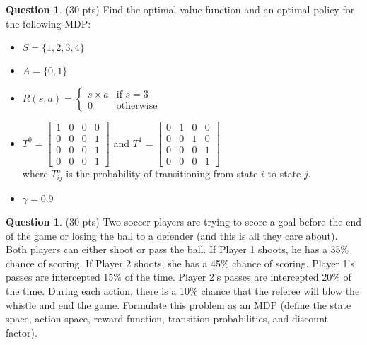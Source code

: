 \documentclass{article}
\theoremstyle{definition}
\newtheorem{question}[thm]{Question}
\begin{document}
\begin{question} (30 pts)
    Find the optimal value function and an optimal policy for the following MDP:
    \begin{itemize}
        \item $S = \{1,2,3,4\}$
        \item $A = \{0,1\}$
        \item $R(s, a) = \begin{cases}
                s \times a &\text{if } s = 3\\
                0 & \text{otherwise}
            \end{cases}$
        \item $T^0 = \begin{bmatrix}
                1 & 0 & 0 & 0 \\
                0 & 0 & 0 & 1 \\
                0 & 0 & 0 & 1 \\
                0 & 0 & 0 & 1
        \end{bmatrix}$ and 
        $T^1 = \begin{bmatrix}
                0 & 1 & 0 & 0 \\
                0 & 0 & 1 & 0 \\
                0 & 0 & 0 & 1 \\
                0 & 0 & 0 & 1
        \end{bmatrix}$ \\
        where $T^a_{ij}$ is the probability of transitioning from state $i$ to state $j$.
    \item $\gamma = 0.9$
    \end{itemize}
\end{question}

\begin{question} (30 pts)
    Two soccer players are trying to score a goal before the end of the game or losing the ball to a defender (and this is all they care about). Both players can either shoot or pass the ball. If Player 1 shoots, he has a 35\% chance of scoring. If Player 2 shoots, she has a 45\% chance of scoring. Player 1's passes are intercepted 15\% of the time. Player 2's passes are intercepted 20\% of the time. During each action, there is a 10\% chance that the referee will blow the whistle and end the game.  Formulate this problem as an MDP (define the state space, action space, reward function, transition probabilities, and discount factor).
\end{question}
\end{document}
